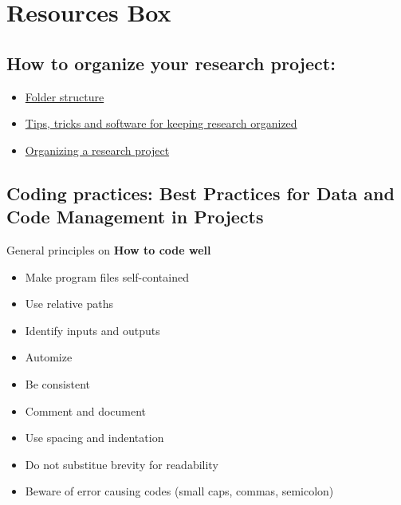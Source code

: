 \documentclass[
]{book}
\providecommand{\tightlist}{%
  \setlength{\itemsep}{0pt}\setlength{\parskip}{0pt}}
\begin{document}
\hypertarget{resources-box-3}{%
\section{Resources Box}\label{resources-box-3}}

\hypertarget{how-to-organize-your-research-project}{%
\subsection{How to organize your research
project:}\label{how-to-organize-your-research-project}}

\begin{itemize}
\tightlist
\item
  \href{https://towardsdatascience.com/how-to-keep-your-research-projects-organized-part-1-folder-structure-10bd56034d3a}{Folder
  structure}
\item
  \href{https://research.cs.queensu.ca/home/audrey/papers/GHC2009.BOFslides.pdf}{Tips,
  tricks and software for keeping research organized}
\item
  \href{https://twp.duke.edu/sites/twp.duke.edu/files/file-attachments/research_project.pdf}{Organizing
  a research project}
\end{itemize}

\hypertarget{coding-practices-best-practices-for-data-and-code-management-in-projects}{%
\subsection{Coding practices: Best Practices for Data and Code
Management in
Projects}\label{coding-practices-best-practices-for-data-and-code-management-in-projects}}

General principles on \textbf{How to code well}

\begin{itemize}
\tightlist
\item
  Make program files self-contained
\item
  Use relative paths
\item
  Identify inputs and outputs
\item
  Automize
\item
  Be consistent
\item
  Comment and document
\item
  Use spacing and indentation
\item
  Do not substitue brevity for readability
\item
  Beware of error causing codes (small caps, commas, semicolon)
\end{itemize}
\end{document}
